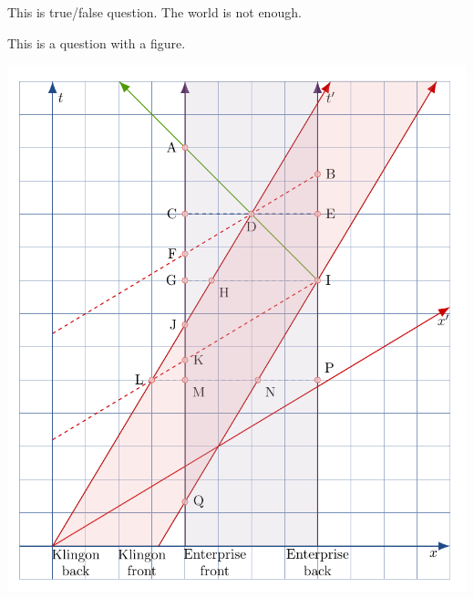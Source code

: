 \begin{questions}
\question[10] \label{ques:questiontf}
\tf[T] This is true/false question. The world is not enough.
\droppoints


\question[10] \label{ques:questionfig}
This is a question with a figure.

    \begin{minipage}[t]{\linewidth}
        \centering
        \includegraphics[scale=0.5]{fig.pdf}
    \end{minipage}
    
\end{questions}
